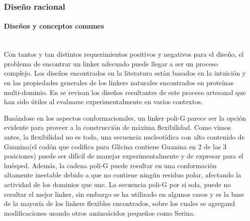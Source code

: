 %             
\subsubsection{Diseño racional}

\paragraph{Diseños y conceptos comunes} \hspace{0pt} \\

Con tantos y tan distintos requerimientos positivos y negativos para el diseño, el problema de encontrar un linker adecuado puede llegar a ser un proceso complejo.
Los diseños encontrados en la literatura están basados en la intuición y en las propiedades generales de los linkers naturales encontrados en proteínas multi-dominio.
En \cite{chen2013fusion} se revisan los diseños resultantes de este proceso artesanal que han sido útiles al evaluarse experimentalmente en varios contextos.



Basándose en los aspectos conformacionales, un linker poli-G parece ser la opción evidente para proveer a la construcción de máxima flexibilidad.
Como vimos antes, la flexibilidad no es todo, una secuencia nucleotídica con alto contenido de Guanina(el codón que codifica para Glicina contiene Guanina en 2 de las 3 posiciones) 
puede ser difícil de manejar experimentalmente y de expresar para el huésped\cite{trinh2004optimization}.
Además, la cadena poli-G puede resultar en una conformación altamente inestable debido a que no contiene ningún residuo polar, afectando la actividad de los dominios que une\cite{robinson1998optimizing}. 
La secuencia poli-G por si sola, puede no resultar el mejor linker, sin embargo se ha utilizado en algunos casos\cite{iwakura1998effects,de2012characterization,sabourin2007flexible} y es la base de la mayoría de los linkers flexibles 
encontrados, sobre los cuales se agregand modificaciones usando otros aminoácidos pequeños como Serina.%

